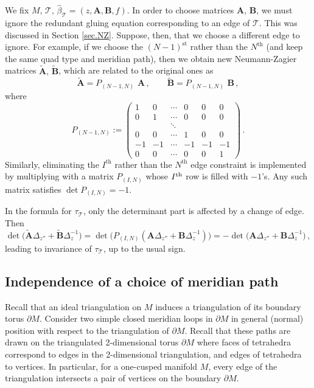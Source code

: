 \documentclass[12pt]{amsart}
\newcommand{\lbl}{\label}
\theoremstyle{definition}
\def\calT{\mathcal T}
\def\pt{\partial}
\def\be{  \begin{equation} }
\def\ee{  \end{equation} }
\newcommand{\CT}{\mathcal{T}}
\newcommand{\wt}{\widetilde}
\newcommand{\mb}{\mathbf}
\numberwithin{equation}{section}
\begin{document}
We fix $M,\,\CT,\,\widehat\beta_\CT=(z,\mb A,\mb B,f)$.
%
In order to choose matrices $\mb A,\,\mb B$, we must ignore the redundant gluing 
equation corresponding to an edge of $\calT$. This was discussed in Section \ref{sec.NZ}.
Suppose, then, that we choose a different edge to ignore. For 
example, if we choose the $(N-1)^{\text{st}}$ rather than the $N^{\text{th}}$ (and keep the same quad type and meridian path), 
then we obtain new Neumann-Zagier matrices $\wt{\mb A},\,\wt{\mb B}$, 
which are related to the original ones as
%
\be \wt{\mb A} =  P_{(N-1,N)}\,\,\mb A\,,\qquad \wt{\mb B} 
=  P_{(N-1,N)}\,\,\mb B\,,\ee
%
where 
%
\be  P_{(N-1,N)} := \begin{pmatrix} 1 & 0 & \cdots & 0 & 0 & 0 \\
 0 & 1 & \cdots & 0 & 0 & 0 \\
 && \ddots &&&\\
 0 & 0 &\cdots & 1 & 0 & 0 \\
 -1 & -1 & \cdots & -1 & -1 & -1 \\
 0 & 0 & \cdots & 0 & 0 & 1
\end{pmatrix}\,.
\ee
%
Similarly, eliminating the $I^{\text{th}}$ rather than the $N^{\text{th}}$ 
edge constraint is implemented by multiplying with a matrix 
$P_{(I,N)}$ whose $I^{\rm th}$ row is filled with $-1$'s. Any such matrix satisfies  $\det P_{(I,N)}=- 1$.

In the formula for $\tau_{\CT}$, only the determinant part is affected by a change of edge. Then
%
\be \det\big(\wt{\mb A}\Delta_{z''}+\wt{\mb B}\Delta_{z}^{-1}\big)
 = \det\big(P_{(I,N)}({\mb A}\Delta_{z''}+{\mb B}\Delta_{z}^{-1})\big)
 = - \det\big({\mb A}\Delta_{z''}+{\mb B}\Delta_{z}^{-1}\big)\,,
\ee
%
leading to invariance of $\tau_{\CT}$, up to the usual sign.


\subsection{Independence of a choice of meridian path}
\lbl{sec.invmerid}

Recall that an ideal triangulation on $M$ induces a triangulation of its
boundary torus $\pt M$. Consider two simple closed meridian loops in $\pt M$ 
in general (normal) position with respect to the triangulation of $\pt M$.
Recall that these paths are drawn on the triangulated 2-dimensional torus 
$\pt M$ where faces of tetrahedra correspond 
to edges in the 2-dimensional triangulation, and edges of tetrahedra to 
vertices. In particular, for a one-cusped manifold $M$, every 
edge of the triangulation intersects a pair of vertices on the boundary $\pt M$.
\end{document}
